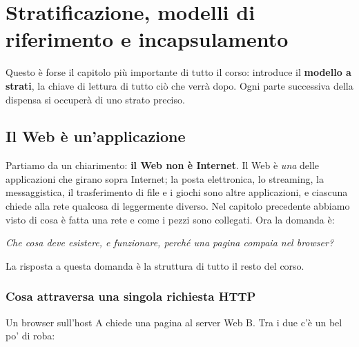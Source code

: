 \chapter{Stratificazione, modelli di riferimento e incapsulamento}

Questo è forse il capitolo più importante di tutto il corso: introduce il \textbf{modello a
strati}, la chiave di lettura di tutto ciò che verrà dopo. Ogni parte successiva della dispensa si
occuperà di uno strato preciso.

\section{Il Web è un'applicazione}

Partiamo da un chiarimento: \textbf{il Web non è Internet}. Il Web è \emph{una} delle applicazioni
che girano sopra Internet; la posta elettronica, lo streaming, la messaggistica, il trasferimento di
file e i giochi sono altre applicazioni, e ciascuna chiede alla rete qualcosa di leggermente diverso.
Nel capitolo precedente abbiamo visto di cosa è fatta una rete e come i pezzi sono collegati. Ora
la domanda è:

\begin{center}
\large\itshape Che cosa deve esistere, e funzionare, perché una pagina compaia nel browser?
\end{center}

La risposta a questa domanda è la struttura di tutto il resto del corso.

\subsection{Cosa attraversa una singola richiesta HTTP}

Un browser sull'host A chiede una pagina al server Web B. Tra i due c'è un bel po' di roba:

